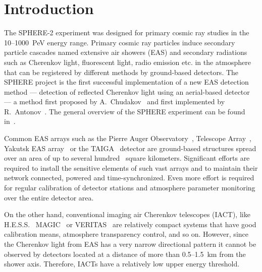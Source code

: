 \documentclass[universe,article,submit,moreauthors,pdftex]{Definitions/mdpi}
\begin{document}
\newcommand{\todoi}[1]{\todo[inline]{ #1}}
\listoftodos[Notes]




\section{Introduction}
The SPHERE-2 experiment was designed for primary cosmic ray  studies in the 10--1000~PeV energy range. Primary cosmic ray particles induce secondary particle cascades named extensive air showers (EAS) and secondary radiations such as Cherenkov light, fluorescent light, radio emission etc. in the atmosphere that can be registered by different methods by ground-based detectors. 
The SPHERE project is the first successful implementation of a new EAS detection method --- detection of reflected Cherenkov light using an aerial-based detector --- a method first proposed by A.~Chudakov~\cite{chu74:VKKL74} and first implemented by R.~Antonov~\cite{ant75, ant86, ant97}. The general overview of the SPHERE experiment can be found in~\cite{Ant15a}.

Common EAS arrays such as the Pierre Auger Observatory~\cite{PAO2015, PAO2021}, Telescope Array~\cite{abu12}, Yakutsk EAS array~\cite{Yakutsk19} or the TAIGA~\cite{TAIGA20} detector are ground-based structures spread over an area of up to several hundred~\cite{abu12} square kilometers. Significant efforts are required to install the sensitive elements of such vast arrays and to maintain their network connected, powered and time-synchronized. Even more effort is required for regular calibration of detector stations and atmosphere parameter monitoring over the entire detector area. 

On the other hand, conventional imaging air Cherenkov telescopes (IACT), like H.E.S.S.~\cite{HESS03a, HESS2006} %
MAGIC~\cite{MAGIC16-1, MAGIC16-2} or VERITAS~\cite{VERITAS2002, VERITAS2009} are relatively compact systems that have good calibration means, 
atmosphere transparency control, and so on. However, since the Cherenkov light from EAS has a very narrow directional pattern it cannot be observed by detectors located at a distance of more than 0.5--1.5~km from the shower axis. Therefore, IACTs have a relatively low upper energy threshold.
\end{document}
